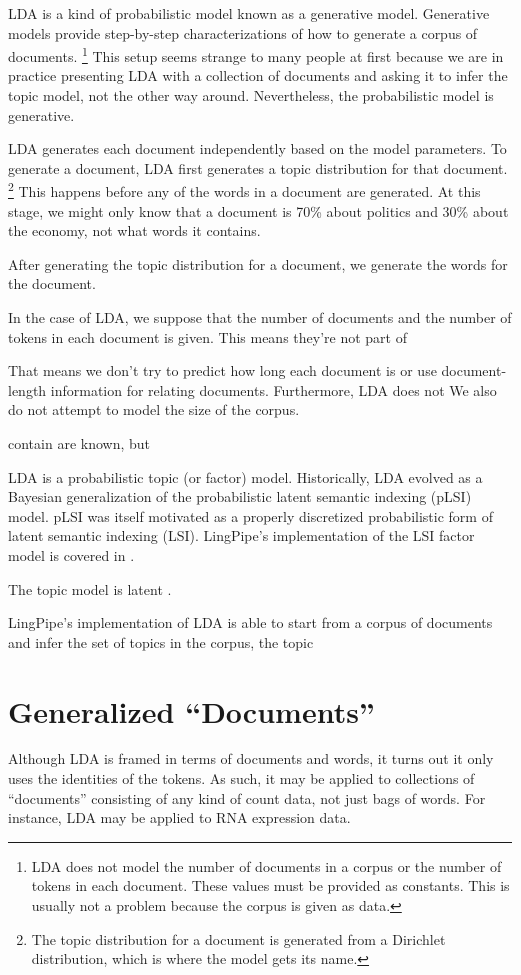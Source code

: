 LDA is a kind of probabilistic model known as a generative model.
Generative models provide step-by-step characterizations of how to
generate a corpus of documents.%
%
\footnote{LDA does not model the number of documents in a corpus
or the number of tokens in each document.  These values must be
provided as constants.  This is usually not a problem because
the corpus is given as data.}
%
This setup seems strange to many people at first because we are in
practice presenting LDA with a collection of documents and asking it
to infer the topic model, not the other way around.  Nevertheless, the
probabilistic model is generative.

LDA generates each document independently based on the model
parameters.  To generate a document, LDA first generates a topic
distribution for that document.%
%
\footnote{The topic distribution for a document is generated from
a Dirichlet distribution, which is where the model gets its name.}
%
This happens before any of the words in a document are generated.  At
this stage, we might only know that a document is 70\% about politics
and 30\% about the economy, not what words it contains.

After generating the topic distribution for a document, we generate
the words for the document.  

In the case of LDA, we suppose that the number of documents and the
number of tokens in each document is given.  This means they're
not part of 

That means we don't try
to predict how long each document is or use document-length
information for relating documents.  Furthermore, LDA does not We also do not attempt to model
the size of the corpus.


contain are known, but 


LDA is a probabilistic topic (or factor) model.  Historically, LDA
evolved as a Bayesian generalization of the probabilistic latent
semantic indexing (pLSI) model.  pLSI was itself motivated as a
properly discretized probabilistic form of latent semantic indexing
(LSI).  LingPipe's implementation of the LSI factor model is covered
in .

The topic model is latent .

LingPipe's implementation of LDA is able to start from a corpus of
documents and infer the set of topics in the corpus, the topic



\section{Generalized ``Documents''}

Although LDA is framed in terms of documents and words, it turns out
it only uses the identities of the tokens.  As such, it may be applied
to collections of ``documents'' consisting of any kind of count data,
not just bags of words.  For instance, LDA may be applied to RNA
expression data.

